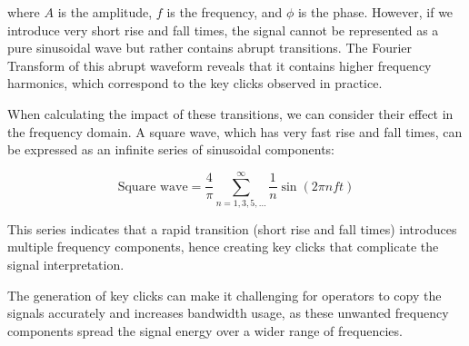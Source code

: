 where \( A \) is the amplitude, \( f \) is the frequency, and \( \phi \) is the phase. However, if we introduce very short rise and fall times, the signal cannot be represented as a pure sinusoidal wave but rather contains abrupt transitions. The Fourier Transform of this abrupt waveform reveals that it contains higher frequency harmonics, which correspond to the key clicks observed in practice.

When calculating the impact of these transitions, we can consider their effect in the frequency domain. A square wave, which has very fast rise and fall times, can be expressed as an infinite series of sinusoidal components:

\[
\text{Square wave} = \frac{4}{\pi} \sum_{n=1,3,5,\ldots}^{\infty} \frac{1}{n} \sin\left(2\pi n f t\right)
\]

This series indicates that a rapid transition (short rise and fall times) introduces multiple frequency components, hence creating key clicks that complicate the signal interpretation.

The generation of key clicks can make it challenging for operators to copy the signals accurately and increases bandwidth usage, as these unwanted frequency components spread the signal energy over a wider range of frequencies. 

